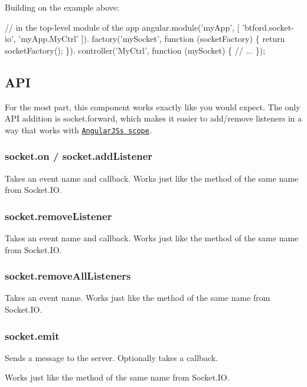 Building on the example above\+:


\begin{DoxyCode}
// in the top-level module of the app
angular.module('myApp', [
  'btford.socket-io',
  'myApp.MyCtrl'
]).
factory('mySocket', function (socketFactory) \{
  return socketFactory();
\}).
controller('MyCtrl', function (mySocket) \{
  // ...
\});
\end{DoxyCode}


\subsection*{A\+PI}

For the most part, this component works exactly like you would expect. The only A\+PI addition is {\ttfamily socket.\+forward}, which makes it easier to add/remove listeners in a way that works with \href{http://docs.angularjs.org/api/ng.$rootScope.Scope}{\tt Angular\+JS\textquotesingle{}s scope}.

\subsubsection*{{\ttfamily socket.\+on} / {\ttfamily socket.\+add\+Listener}}

Takes an event name and callback. Works just like the method of the same name from Socket.\+IO.

\subsubsection*{{\ttfamily socket.\+remove\+Listener}}

Takes an event name and callback. Works just like the method of the same name from Socket.\+IO.

\subsubsection*{{\ttfamily socket.\+remove\+All\+Listeners}}

Takes an event name. Works just like the method of the same name from Socket.\+IO.

\subsubsection*{{\ttfamily socket.\+emit}}

Sends a message to the server. Optionally takes a callback.

Works just like the method of the same name from Socket.\+IO.

